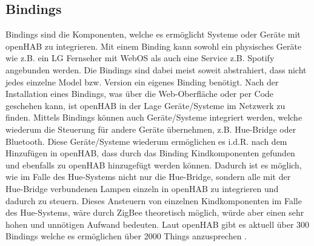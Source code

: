 \subsection{Bindings} \label{sec:Bindings}
Bindings sind die Komponenten, welche es ermöglicht Systeme oder Geräte mit openHAB zu integrieren. Mit einem Binding kann sowohl ein physisches Geräte wie z.B. ein LG Fernseher mit WebOS als auch eine Service z.B. Spotify angebunden werden. Die Bindings sind dabei meist soweit abstrahiert, dass nicht jedes einzelne Model bzw. Version ein eigenes Binding benötigt.
Nach der Installation eines Bindings, was über die Web-Oberfläche oder per Code geschehen kann, ist openHAB in der Lage Geräte/Systeme im Netzwerk zu finden. Mittels Bindings können auch Geräte/Systeme integriert werden, welche wiederum die Steuerung für andere Geräte übernehmen, z.B. Hue-Bridge oder Bluetooth. Diese Geräte/Systeme wiederum ermöglichen es i.d.R. nach dem Hinzufügen in openHAB, dass durch das Binding Kindkomponenten gefunden und ebenfalls zu openHAB hinzugefügt werden können. Dadurch ist es möglich, wie im Falle des Hue-Systems nicht nur die Hue-Bridge, sondern alle mit der Hue-Bridge verbundenen Lampen einzeln in openHAB zu integrieren und dadurch zu steuern. Dieses Ansteuern von einzelnen Kindkomponenten im Falle des Hue-Systems, wäre durch ZigBee theoretisch möglich, würde aber einen sehr hohen und unnötigen Aufwand bedeuten.
Laut openHAB gibt es aktuell über 300 Bindings welche es ermöglichen über 2000 Things anzusprechen \cite{OPENHUB00:OH}.

